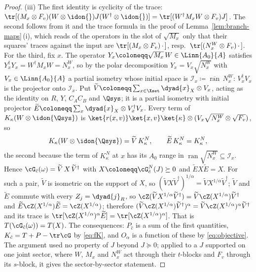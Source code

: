 \begin{proof}
(iii) The first identity is cyclicity of the trace:
$\tr[(M_x\otimes F_v)(W\otimes\idon{})J(W^{\dagger}\otimes\idon{})]
=\tr[(W^{\dagger}M_xW\otimes F_v)J]$. The second follows from it and the
trace formula in the proof of Lemma~\ref{lem:branch-maps}\,(i), which reads of the
operators in the slot of $\sqrt{M_x}$ only that their squares' traces against
the input are $\tr[(M_x\otimes F_v)\,\cdot\,]$, resp.\
$\tr[(N^{W}_x\otimes F_v)\,\cdot\,]$. For the third, fix $x$. The operator
$Y_x\coloneqq\sqrt{M_x}\,W\in\Linn{A_0}{A}$ satisfies
$Y_x^{\dagger}Y_x=W^{\dagger}M_xW=N^{W}_x$, so by the polar decomposition
$Y_x=V_x\sqrt{N^{W}_x}$ with $V_x\in\Linn{A_0}{A}$ a partial isometry whose
initial space is $\mathcal{I}_x\coloneqq\overline{\operatorname{ran}}\,N^{W}_x$:
$V_x^{\dagger}V_x$ is the projector onto $\mathcal{I}_x$. Put
$\widetilde V\coloneqq\sum_{x\in\Xset}\dyad{x}_X\otimes V_x$, acting as the
identity on $R$, $Y$, $C_AC_B$ and $\Qsys$; it is a partial isometry with
initial projector
$\widetilde E\coloneqq\sum_x\dyad{x}_X\otimes V_x^{\dagger}V_x$. Every term
of $K_{\kappa}(W\otimes\idon{\Qsys})$ is
$\ket{r(x,v)}\ket{x,v}\ket{\kappa}\otimes(V_x\sqrt{N^{W}_x}\otimes\sqrt{F_v})$,
so
\begin{equation*}
  K_{\kappa}(W\otimes\idon{\Qsys})=\widetilde V\,K^{N}_{\kappa},\qquad
  \widetilde E\,K^{N}_{\kappa}=K^{N}_{\kappa},
\end{equation*}
the second because the term of $K^{N}_{\kappa}$ at $x$ has its $A_0$ range in
$\operatorname{ran}\sqrt{N^{W}_x}\subseteq\mathcal{I}_x$. Hence
$\cG_{\hat c}(\omega)=\widetilde V\,X\,\widetilde V^{\dagger}$ with
$X\coloneqq\cG^{N}_{\hat c}(J)\succeq0$ and $\widetilde EX\widetilde E=X$.
For such a pair, $\widetilde V$ is isometric on the support of $X$, so
$(\widetilde VX\widetilde V^{\dagger})^{1/\alpha}
=\widetilde VX^{1/\alpha}\widetilde V^{\dagger}$; $\widetilde V$ and
$\widetilde E$ commute with every $Z_j=\dyad{j}_R$, so
$\cZ(\widetilde VX^{1/\alpha}\widetilde V^{\dagger})
=\widetilde V\cZ(X^{1/\alpha})\widetilde V^{\dagger}$ and
$\widetilde E\cZ(X^{1/\alpha})\widetilde E=\cZ(X^{1/\alpha})$; therefore
$(\widetilde V\cZ(X^{1/\alpha})\widetilde V^{\dagger})^{\alpha}
=\widetilde V\cZ(X^{1/\alpha})^{\alpha}\widetilde V^{\dagger}$ and its trace
is $\tr[\cZ(X^{1/\alpha})^{\alpha}\widetilde E]=\tr[\cZ(X^{1/\alpha})^{\alpha}]$.
That is $T(\cG_{\hat c}(\omega))=T(X)$. The consequences: $P_{\hat c}$ is a
sum of the first quantities, $K_{\hat c}=T+P-\tr\cG$ by \eqref{eq:fK}, and
$O_{\alpha}$ is a function of these by \eqref{eq:objective}. The argument
used no property of $J$ beyond $J\succeq0$; applied to a $J$ supported on
one joint sector, where $W$, $M_x$ and $N^{W}_x$ act through their $t$-blocks
and $F_v$ through its $s$-block, it gives the sector-by-sector statement.


\end{proof}
